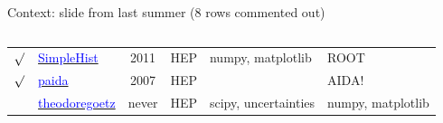\documentclass[aspectratio=169]{beamer}
\begin{document}
\begin{frame}{Context: slide from last summer (8 rows commented out)}
\begin{columns}
\begin{tabular}{c l c p{2.7 cm} p{1.5 cm} p{4.75 cm}}
$\surd$ & \href{https://pypi.python.org/pypi/SimpleHist}{\textcolor{blue}{SimpleHist}} & 2011 & HEP & numpy, matplotlib & ROOT \\
$\surd$ & \href{https://pypi.org/project/paida}{\textcolor{blue}{paida}} & 2007 & HEP & & AIDA! \\
& \href{https://github.com/theodoregoetz/histogram}{\textcolor{blue}{theodoregoetz}} & never & HEP & scipy, \mbox{uncertainties} & numpy, matplotlib \\
\end{tabular}
\end{columns}
\end{frame}
\end{document}
